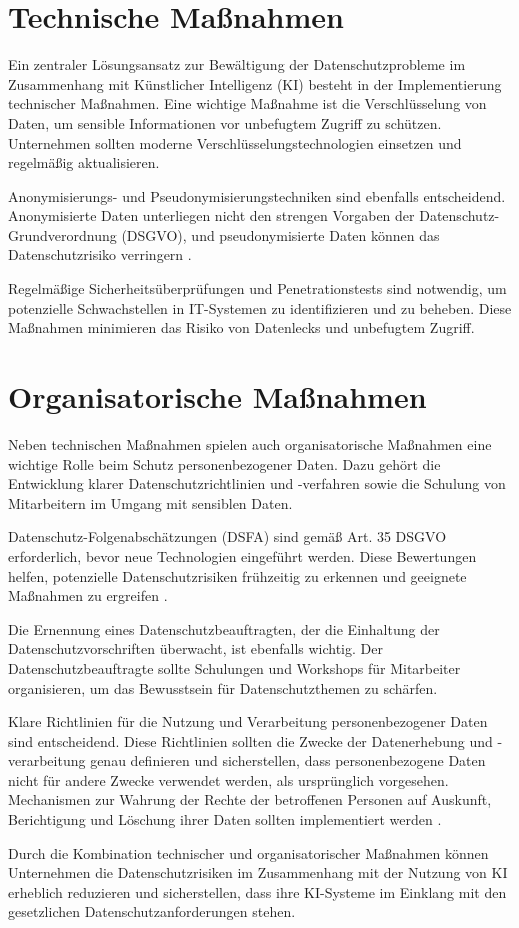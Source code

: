 \section{Technische Maßnahmen}
Ein zentraler Lösungsansatz zur Bewältigung der Datenschutzprobleme im
Zusammenhang mit Künstlicher Intelligenz (KI) besteht in der Implementierung
technischer Maßnahmen. Eine wichtige Maßnahme ist die Verschlüsselung von Daten,
um sensible Informationen vor unbefugtem Zugriff zu schützen. Unternehmen
sollten moderne Verschlüsselungstechnologien einsetzen und regelmäßig
aktualisieren.

Anonymisierungs- und Pseudonymisierungstechniken sind ebenfalls entscheidend.
Anonymisierte Daten unterliegen nicht den strengen Vorgaben der
Datenschutz-Grundverordnung (DSGVO), und pseudonymisierte Daten können das
Datenschutzrisiko verringern \cite{conrad_2017}.

Regelmäßige Sicherheitsüberprüfungen und Penetrationstests sind notwendig, um
potenzielle Schwachstellen in IT-Systemen zu identifizieren und zu beheben.
Diese Maßnahmen minimieren das Risiko von Datenlecks und unbefugtem Zugriff.

\section{Organisatorische Maßnahmen}
Neben technischen Maßnahmen spielen auch organisatorische Maßnahmen eine
wichtige Rolle beim Schutz personenbezogener Daten. Dazu gehört die Entwicklung
klarer Datenschutzrichtlinien und -verfahren sowie die Schulung von Mitarbeitern
im Umgang mit sensiblen Daten.

Datenschutz-Folgenabschätzungen (DSFA) sind gemäß Art. 35 DSGVO erforderlich,
bevor neue Technologien eingeführt werden. Diese Bewertungen helfen, potenzielle
Datenschutzrisiken frühzeitig zu erkennen und geeignete Maßnahmen zu ergreifen
\cite{conrad_2017}.

Die Ernennung eines Datenschutzbeauftragten, der die Einhaltung der
Datenschutzvorschriften überwacht, ist ebenfalls wichtig. Der
Datenschutzbeauftragte sollte Schulungen und Workshops für Mitarbeiter
organisieren, um das Bewusstsein für Datenschutzthemen zu schärfen.

Klare Richtlinien für die Nutzung und Verarbeitung personenbezogener Daten sind
entscheidend. Diese Richtlinien sollten die Zwecke der Datenerhebung und
-verarbeitung genau definieren und sicherstellen, dass personenbezogene Daten
nicht für andere Zwecke verwendet werden, als ursprünglich vorgesehen.
Mechanismen zur Wahrung der Rechte der betroffenen Personen auf Auskunft,
Berichtigung und Löschung ihrer Daten sollten implementiert werden
\cite{conrad_2017}.

Durch die Kombination technischer und organisatorischer Maßnahmen können
Unternehmen die Datenschutzrisiken im Zusammenhang mit der Nutzung von KI
erheblich reduzieren und sicherstellen, dass ihre KI-Systeme im Einklang mit den
gesetzlichen Datenschutzanforderungen stehen.